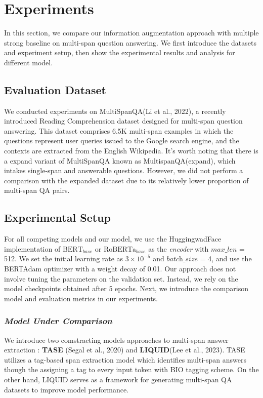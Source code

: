 
\section{Experiments}
In this section, we compare our information augmentation approach with multiple strong baseline on multi-span question answering. We first introduce the datasets and experiment setup, then show the experimental results and analysis for different model.

\subsection{Evaluation Dataset}
\label{sec:datasets}
We conducted experiments on MultiSpanQA(Li et al., 2022), a recently introduced Reading Comprehension dataset designed for multi-span question answering. This dataset comprises 6.5K multi-span examples in which the questions represent user queries issued to the Google search engine, and the contexts are extracted from the English Wikipedia. It's worth noting that there is a expand variant of MultiSpanQA known as MultispanQA(expand), which intakes single-span and answerable questions. However, we did not perform a comparison with the expanded dataset due to its relatively lower proportion of multi-span QA pairs.

\subsection{Experimental Setup}
For all competing models and our model, we use the HuggingwadFace implementation of $\text{BERT}_{base}$ or $\text{RoBERTa}_{base}$ as the \textit{encoder} with $\textit{max\_len}$ = 512. We set the initial learning rate as $3 \times 10^{-5}$ and  $\textit{batch\_size}$ = 4, and use the BERTAdam optimizer with a weight decay of 0.01. Our approach does not involve tuning the parameters on the validation set. Instead, we rely on the model checkpoints obtained after 5 epochs. Next, we introduce the comparison model and evaluation metrics in our experiments.

\subsubsection{\textit{Model Under Comparison}}
\label{sec:baselines}
We introduce two comstracting models approaches to multi-span answer extraction : \textbf{TASE} (Segal et al., 2020) and \textbf{LIQUID}(Lee et al., 2023). TASE utilizes a tag-based span extraction model which identifies multi-span answers though the assigning a tag to every input token with BIO tagging scheme. On the other hand, LIQUID serves as a framework for generating multi-span QA datasets to improve model performance.

